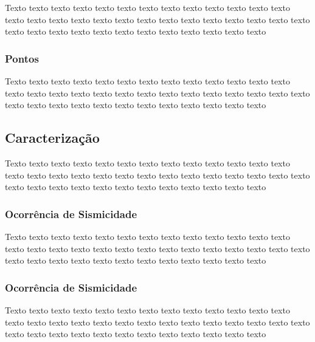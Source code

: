 Texto texto texto texto texto texto texto texto texto texto texto texto texto
texto texto texto texto texto texto texto texto texto texto texto texto texto
texto texto texto texto texto texto texto texto texto texto texto texto texto



\subsubsection{Pontos}
\label{sec:fonte_falha_complexa}


Texto texto texto texto texto texto texto texto texto texto texto texto texto
texto texto texto texto texto texto texto texto texto texto texto texto texto
texto texto texto texto texto texto texto texto texto texto texto texto texto



\subsection{Caracterização}
\label{sec:fontes}



Texto texto texto texto texto texto texto texto texto texto texto texto texto
texto texto texto texto texto texto texto texto texto texto texto texto texto
texto texto texto texto texto texto texto texto texto texto texto texto texto



\subsubsection{Ocorrência de Sismicidade}
\label{sec:fontes}


Texto texto texto texto texto texto texto texto texto texto texto texto texto
texto texto texto texto texto texto texto texto texto texto texto texto texto
texto texto texto texto texto texto texto texto texto texto texto texto texto


\subsubsection{Ocorrência de Sismicidade}
\label{sec:fontes}




Texto texto texto texto texto texto texto texto texto texto texto texto texto
texto texto texto texto texto texto texto texto texto texto texto texto texto
texto texto texto texto texto texto texto texto texto texto texto texto texto



